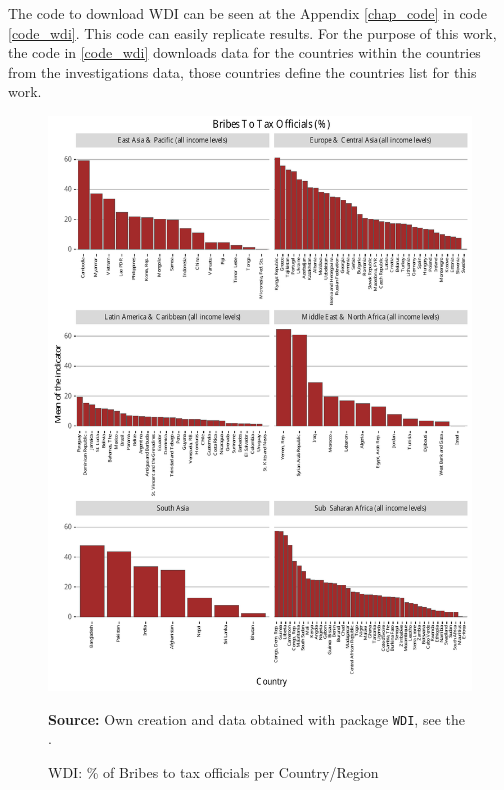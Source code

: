The code to download WDI can be seen at the Appendix \ref{chap_code} in code \ref{code_wdi}. This code can easily replicate results. For the purpose of this work, the code in \ref{code_wdi} downloads data for the countries within the countries from the investigations data, those countries define the countries list for this work.



\begin{figure}[H]
\begin{center}
\caption{WDI: \% of Bribes to tax officials per Country/Region}
\label{fig_wdi_bribes}
\includegraphics[max height=.9\textheight]{../img/wdi_bribes_to_tax_officials_perc.pdf}
\end{center}
\noindent \footnotesize{\textbf{Source:} Own creation and data obtained with package \texttt{WDI}, see the \cite{wb_r}.}
\end{figure}

